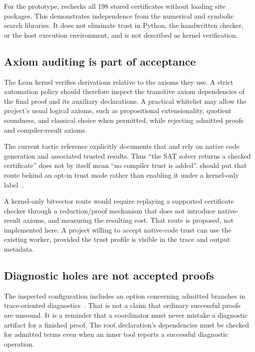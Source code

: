 For the prototype,  rechecks all 198 stored certificates without loading site packages. This demonstrates independence from the numerical and symbolic search libraries. It does not eliminate trust in Python, the handwritten checker, or the host execution environment, and is not described as kernel verification.

\subsection{Axiom auditing is part of acceptance}

The Lean kernel verifies derivations relative to the axioms they use. A strict automation policy should therefore inspect the transitive axiom dependencies of the final proof and its auxiliary declarations. A practical whitelist may allow the project's usual logical axioms, such as propositional extensionality, quotient soundness, and classical choice when permitted, while rejecting admitted proofs and compiler-result axioms.

The current tactic reference explicitly documents that  and  rely on native code generation and associated trusted results. Thus ``the SAT solver returns a checked certificate'' does not by itself mean ``no compiler trust is added''. \forge{} should put that route behind an opt-in trust mode rather than enabling it under a kernel-only label~\cite{tacticref}.

A kernel-only bitvector route would require replaying a supported certificate checker through a reduction/proof mechanism that does not introduce native-result axioms, and measuring the resulting cost. That route is proposed, not implemented here. A project willing to accept native-code trust can use the existing worker, provided the trust profile is visible in the trace and output metadata.

\subsection{Diagnostic holes are not accepted proofs}

The inspected \grind{} configuration includes an option concerning admitted branches in trace-oriented diagnostics~\cite{grindconfig}. That is not a claim that ordinary successful \grind{} proofs are unsound. It is a reminder that a coordinator must never mistake a diagnostic artifact for a finished proof. The root declaration's dependencies must be checked for admitted terms even when an inner tool reports a successful diagnostic operation.

